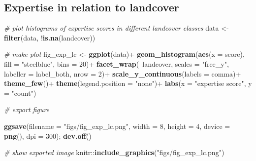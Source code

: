 \documentclass[]{article}
\newenvironment{Shaded}{}{}
\newcommand{\CommentTok}[1]{\textcolor[rgb]{0.38,0.63,0.69}{\textit{#1}}}
\newcommand{\DataTypeTok}[1]{\textcolor[rgb]{0.56,0.13,0.00}{#1}}
\newcommand{\DecValTok}[1]{\textcolor[rgb]{0.25,0.63,0.44}{#1}}
\newcommand{\KeywordTok}[1]{\textcolor[rgb]{0.00,0.44,0.13}{\textbf{#1}}}
\newcommand{\NormalTok}[1]{#1}
\newcommand{\OperatorTok}[1]{\textcolor[rgb]{0.40,0.40,0.40}{#1}}
\newcommand{\StringTok}[1]{\textcolor[rgb]{0.25,0.44,0.63}{#1}}
\begin{document}
\hypertarget{expertise-in-relation-to-landcover}{%
\subsection{Expertise in relation to landcover}\label{expertise-in-relation-to-landcover}}

\begin{Shaded}
\begin{Highlighting}[]
\CommentTok{# plot histograms of expertise scores in different landcover classes}
\NormalTok{data <-}\StringTok{ }\KeywordTok{filter}\NormalTok{(data, }\OperatorTok{!}\KeywordTok{is.na}\NormalTok{(landcover))}

\CommentTok{# make plot}
\NormalTok{fig_exp_lc <-}\StringTok{ }\KeywordTok{ggplot}\NormalTok{(data)}\OperatorTok{+}
\StringTok{  }\KeywordTok{geom_histogram}\NormalTok{(}\KeywordTok{aes}\NormalTok{(}\DataTypeTok{x =}\NormalTok{ score), }\DataTypeTok{fill =} \StringTok{"steelblue"}\NormalTok{, }\DataTypeTok{bins =} \DecValTok{20}\NormalTok{)}\OperatorTok{+}
\StringTok{  }\KeywordTok{facet_wrap}\NormalTok{(}\OperatorTok{~}\NormalTok{landcover, }\DataTypeTok{scales =} \StringTok{"free_y"}\NormalTok{, }\DataTypeTok{labeller =}\NormalTok{ label_both, }\DataTypeTok{nrow =} \DecValTok{2}\NormalTok{)}\OperatorTok{+}
\StringTok{  }\KeywordTok{scale_y_continuous}\NormalTok{(}\DataTypeTok{labels =}\NormalTok{ comma)}\OperatorTok{+}
\StringTok{  }\KeywordTok{theme_few}\NormalTok{()}\OperatorTok{+}
\StringTok{  }\KeywordTok{theme}\NormalTok{(}\DataTypeTok{legend.position =} \StringTok{"none"}\NormalTok{)}\OperatorTok{+}
\StringTok{  }\KeywordTok{labs}\NormalTok{(}\DataTypeTok{x =} \StringTok{"expertise score"}\NormalTok{, }\DataTypeTok{y =} \StringTok{"count"}\NormalTok{)}

\CommentTok{# export figure}

\KeywordTok{ggsave}\NormalTok{(}\DataTypeTok{filename =} \StringTok{"figs/fig_exp_lc.png"}\NormalTok{, }\DataTypeTok{width =} \DecValTok{8}\NormalTok{, }\DataTypeTok{height =} \DecValTok{4}\NormalTok{, }\DataTypeTok{device =} \KeywordTok{png}\NormalTok{(), }\DataTypeTok{dpi =} \DecValTok{300}\NormalTok{); }\KeywordTok{dev.off}\NormalTok{()}
\end{Highlighting}
\end{Shaded}

\begin{Shaded}
\begin{Highlighting}[]

\CommentTok{# show exported image}
\NormalTok{knitr}\OperatorTok{::}\KeywordTok{include_graphics}\NormalTok{(}\StringTok{"figs/fig_exp_lc.png"}\NormalTok{)}
\end{Highlighting}
\end{Shaded}
\end{document}
